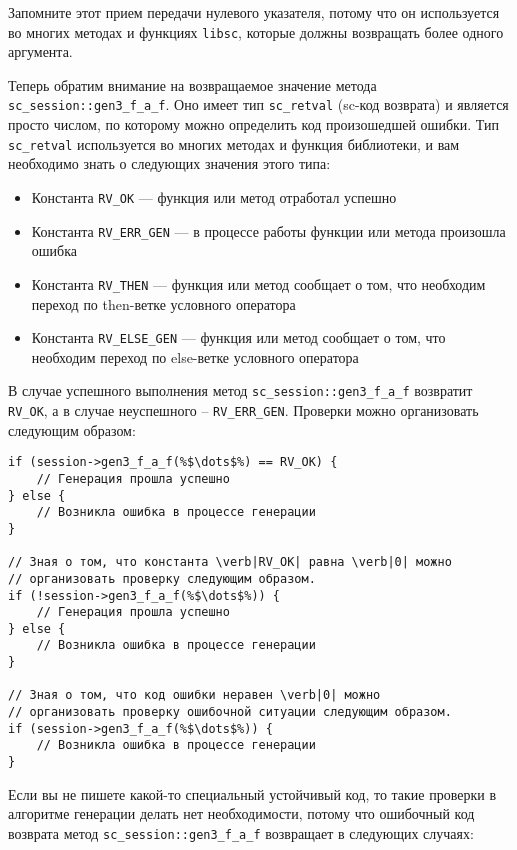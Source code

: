 Запомните этот прием передачи нулевого указателя, потому что он
используется во многих методах и функциях \texttt{libsc}, которые
должны возвращать более одного аргумента.

Теперь обратим внимание на возвращаемое значение метода
\lstinline|sc_session::gen3_f_a_f|. Оно имеет тип
\lstinline|sc_retval| (sc-код возврата) и является просто числом, по
которому можно определить код произошедшей ошибки. Тип
\lstinline|sc_retval| используется во многих методах и функция
библиотеки, и вам необходимо знать о следующих значения этого типа:

\begin{itemize}
\item Константа \lstinline|RV_OK| --- функция или метод отработал
  успешно
\item Константа \lstinline|RV_ERR_GEN| --- в процессе работы функции
  или метода произошла ошибка
\item Константа \lstinline|RV_THEN| --- функция или метод сообщает о
  том, что необходим переход по then-ветке условного оператора
\item Константа \lstinline|RV_ELSE_GEN| --- функция или метод сообщает
  о том, что необходим переход по else-ветке условного оператора
\end{itemize}

В случае успешного выполнения метод \lstinline|sc_session::gen3_f_a_f|
возвратит \lstinline|RV_OK|, а в случае неуспешного –
\lstinline|RV_ERR_GEN|. Проверки можно организовать следующим образом:

\begin{lstlisting}[texcl]
if (session->gen3_f_a_f(%$\dots$%) == RV_OK) {
    // Генерация прошла успешно
} else {
    // Возникла ошибка в процессе генерации
}

// Зная о том, что константа \verb|RV_OK| равна \verb|0| можно
// организовать проверку следующим образом.
if (!session->gen3_f_a_f(%$\dots$%)) {
    // Генерация прошла успешно
} else {
    // Возникла ошибка в процессе генерации
}

// Зная о том, что код ошибки неравен \verb|0| можно
// организовать проверку ошибочной ситуации следующим образом.
if (session->gen3_f_a_f(%$\dots$%)) {
    // Возникла ошибка в процессе генерации
}
\end{lstlisting}

Если вы не пишете какой-то специальный устойчивый код, то такие
проверки в алгоритме генерации делать нет необходимости, потому что
ошибочный код возврата метод \lstinline|sc_session::gen3_f_a_f|
возвращает в следующих случаях:

